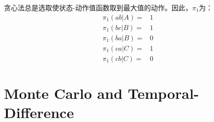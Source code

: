 \documentclass[12pt, a4paper]{article}
\begin{document}
\begin{enumerate}
        贪心法总是选取使状态-动作值函数取到最大值的动作。因此，$\pi_1$为：
        \begin{align*}
        \pi_1(ab \vert A) =& 1 \\
        \pi_1(bc \vert B) =& 1 \\
        \pi_1(ba \vert B) =& 0 \\
        \pi_1(ca \vert C) =& 1 \\
        \pi_1(cb \vert C) =& 0
        \end{align*}

    \end{enumerate}

\section{Monte Carlo and Temporal-Difference}
\end{document}
